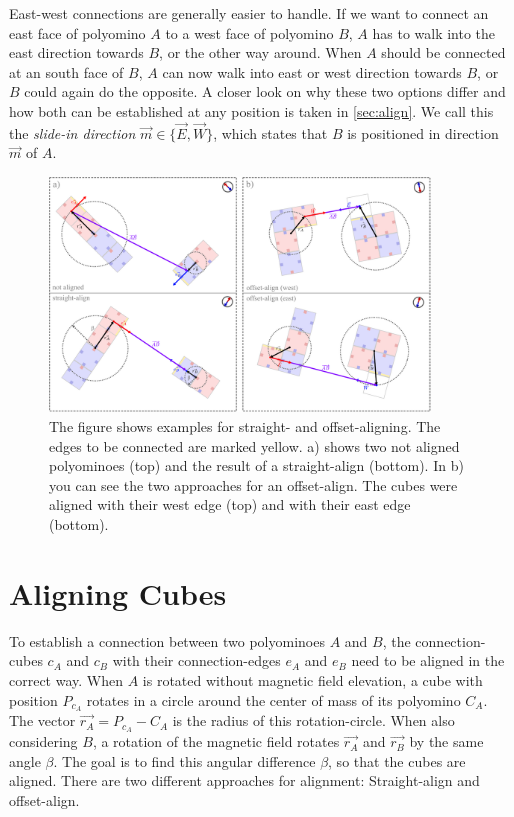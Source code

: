 East-west connections are generally easier to handle.
If we want to connect an east face of polyomino $A$ to a west face of polyomino $B$, $A$ has to walk into the east direction towards $B$, or the other way around.
When $A$ should be connected at an south face of $B$, $A$ can now walk into east or west direction towards $B$, or $B$ could again do the opposite.
A closer look on why these two options differ and how both can be established at any position is taken in \autoref{sec:align}.
We call this the \textit{slide-in direction} $\vec{m} \in \{\vec{E}, \vec{W}\}$, which states that $B$ is positioned in direction $\vec{m}$ of $A$.

\begin{figure}
	\centering
	\includegraphics[width=0.90\textwidth]{figures/aligning.pdf}
	\caption[Illustration of straight- and offset-aligning]{The figure shows examples for straight- and offset-aligning. The edges to be connected are marked yellow. a) shows two not aligned polyominoes (top) and the result of a straight-align (bottom). In b) you can see the two approaches for an offset-align. The cubes were aligned with their west edge (top) and with their east edge (bottom).}
	\label{fig:aligning}
\end{figure}

\section{Aligning Cubes}
\label{sec:align}

To establish a connection between two polyominoes $A$ and $B$, the connection-cubes $c_A$ and $c_B$ with their connection-edges $e_A$ and $e_B$ need to be aligned in the correct way.
When $A$ is rotated without magnetic field elevation, a cube with position $P_{c_A}$ rotates in a circle around the center of mass of its polyomino $C_A$.
The vector $\vec{r_A} = P_{c_A} - C_A$ is the radius of this rotation-circle.
When also considering $B$, a rotation of the magnetic field rotates $\vec{r_A}$ and $\vec{r_B}$ by the same angle $\beta$.
The goal is to find this angular difference $\beta$, so that the cubes are aligned.
There are two different approaches for alignment: Straight-align and offset-align.

